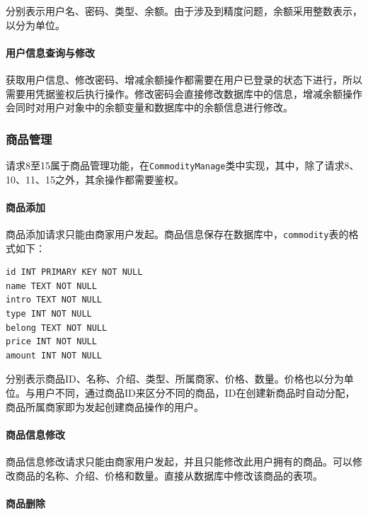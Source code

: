 \documentclass[lang=cn,11pt,a4paper,cite=authornum]{paper}
\begin{document}
分别表示用户名、密码、类型、余额。由于涉及到精度问题，余额采用整数表示，以分为单位。

\paragraph{用户信息查询与修改}

获取用户信息、修改密码、增减余额操作都需要在用户已登录的状态下进行，所以需要用凭据鉴权后执行操作。修改密码会直接修改数据库中的信息，增减余额操作会同时对用户对象中的余额变量和数据库中的余额信息进行修改。

\subsubsection{商品管理}

请求8至15属于商品管理功能，在\texttt{CommodityManage}类中实现，其中，除了请求8、10、11、15之外，其余操作都需要鉴权。

\paragraph{商品添加}

商品添加请求只能由商家用户发起。商品信息保存在数据库中，\texttt{commodity}表的格式如下：

\begin{code}
\begin{verbatim}
id INT PRIMARY KEY NOT NULL
name TEXT NOT NULL
intro TEXT NOT NULL
type INT NOT NULL
belong TEXT NOT NULL
price INT NOT NULL
amount INT NOT NULL
\end{verbatim}
\end{code}

分别表示商品ID、名称、介绍、类型、所属商家、价格、数量。价格也以分为单位。与用户不同，通过商品ID来区分不同的商品，ID在创建新商品时自动分配，商品所属商家即为发起创建商品操作的用户。

\paragraph{商品信息修改}

商品信息修改请求只能由商家用户发起，并且只能修改此用户拥有的商品。可以修改商品的名称、介绍、价格和数量。直接从数据库中修改该商品的表项。

\paragraph{商品删除}
\end{document}
